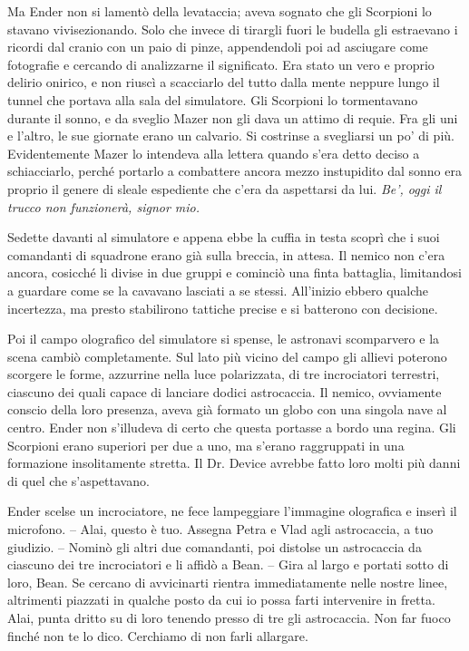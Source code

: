 {Ma Ender non si lamentò della levataccia; aveva sognato che gli
	Scorpioni lo stavano vivisezionando. Solo che invece di tirargli fuori
	le budella gli estraevano i ricordi dal cranio con un paio di pinze,
	appendendoli poi ad asciugare come fotografie e cercando di analizzarne
	il significato. Era stato un vero e proprio delirio onirico, e non
	riuscì a scacciarlo del tutto dalla mente neppure lungo il tunnel che
	portava alla sala del simulatore. Gli Scorpioni lo tormentavano durante
	il sonno, e da sveglio Mazer non gli dava un attimo di requie. Fra gli
	uni e l'altro, le sue giornate erano un calvario. Si costrinse a
	svegliarsi un po' di più. Evidentemente Mazer lo intendeva alla lettera
	quando s'era detto deciso a schiacciarlo, perché portarlo a combattere
	ancora mezzo instupidito dal sonno era proprio il genere di sleale
	espediente che c'era da aspettarsi da lui. \emph{Be', oggi il trucco non
		funzionerà, signor mio.}}

{Sedette davanti al simulatore e appena ebbe la cuffia in testa scoprì
	che i suoi comandanti di squadrone erano già sulla breccia, in attesa.
	Il nemico non c'era ancora, cosicché li divise in due gruppi e cominciò
	una finta battaglia, limitandosi a guardare come se la cavavano lasciati
	a se stessi. All'inizio ebbero qualche incertezza, ma presto stabilirono
	tattiche precise e si batterono con decisione.}

{Poi il campo olografico del simulatore si spense, le astronavi
	scomparvero e la scena cambiò completamente. Sul lato più vicino del
	campo gli allievi poterono scorgere le forme, azzurrine nella luce
	polarizzata, di tre incrociatori terrestri, ciascuno dei quali capace di
	lanciare dodici astrocaccia. Il nemico, ovviamente conscio della loro
	presenza, aveva già formato un globo con una singola nave al centro.
	Ender non s'illudeva di certo che questa portasse a bordo una regina.
	Gli Scorpioni erano superiori per due a uno, ma s'erano raggruppati in
	una formazione insolitamente stretta. Il Dr. Device avrebbe fatto loro
	molti più danni di quel che s'aspettavano.}

{Ender scelse un incrociatore, ne fece lampeggiare l'immagine olografica
	e inserì il microfono. -- Alai, questo è tuo. Assegna Petra e Vlad agli
	astrocaccia, a tuo giudizio. -- Nominò gli altri due comandanti, poi
	distolse un astrocaccia da ciascuno dei tre incrociatori e li affidò a
	Bean. -- Gira al largo e portati sotto di loro, Bean. Se cercano di
	avvicinarti rientra immediatamente nelle nostre linee, altrimenti
	piazzati in qualche posto da cui io possa farti intervenire in fretta.
	Alai, punta dritto su di loro tenendo presso di tre gli astrocaccia. Non
	far fuoco finché non te lo dico. Cerchiamo di non farli allargare.}

